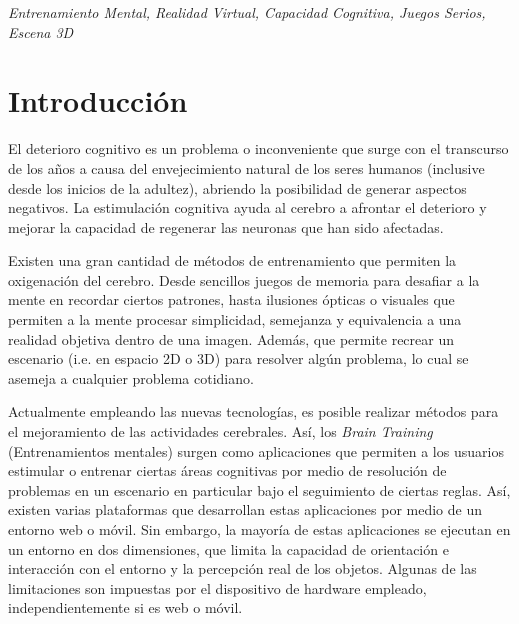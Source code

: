 \documentclass[conference]{IEEEtran}
\begin{document}
\begin{IEEEkeywords}
\textit{Entrenamiento Mental, Realidad Virtual, Capacidad Cognitiva, Juegos Serios, Escena 3D}
\end{IEEEkeywords}



%
\IEEEpeerreviewmaketitle


\section{Introducci\'on}
El deterioro cognitivo es un problema o inconveniente que surge con el transcurso de los años a causa del envejecimiento natural de los seres humanos (inclusive desde los inicios de la adultez), abriendo la posibilidad de generar aspectos negativos. La estimulación cognitiva ayuda al cerebro a afrontar el deterioro y mejorar la capacidad de regenerar las neuronas que han sido afectadas. 
  
Existen una gran cantidad de métodos de entrenamiento que permiten la oxigenación del cerebro. Desde sencillos juegos de memoria para desafiar a la mente en recordar ciertos patrones, hasta ilusiones ópticas o visuales que permiten a la mente procesar simplicidad, semejanza y equivalencia a una realidad objetiva dentro de una imagen. Además, que permite recrear un escenario (i.e. en espacio 2D o 3D) para resolver algún problema, lo cual se asemeja a cualquier problema cotidiano. 
  
Actualmente empleando las nuevas tecnologías, es posible realizar métodos para el mejoramiento de las actividades cerebrales. Así, los \textit{Brain Training} (Entrenamientos mentales) surgen como aplicaciones que permiten a los usuarios estimular o entrenar ciertas áreas cognitivas por medio de resolución de problemas en un escenario en particular bajo el seguimiento de ciertas reglas. Así, existen varias plataformas que desarrollan estas aplicaciones por medio de un entorno web o móvil. Sin embargo, la mayoría de estas aplicaciones se ejecutan en un entorno en dos dimensiones, que limita la capacidad de orientación e interacción con el entorno y la percepción real de los objetos. Algunas de las limitaciones son impuestas por el dispositivo de hardware empleado, independientemente si es web o móvil.  
  
\end{document}

